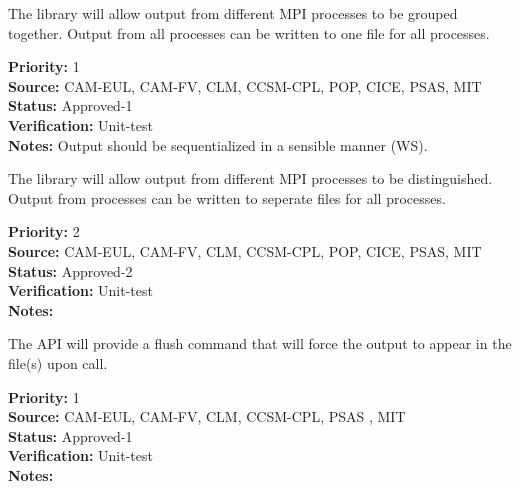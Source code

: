 The library will allow output from different MPI processes to be grouped together.  
Output from all processes can be written to one file for all processes.

\begin{reqlist}
{\bf Priority:} 1 \\
{\bf Source:} CAM-EUL, CAM-FV, CLM, CCSM-CPL, POP, CICE, PSAS, MIT  \\
{\bf Status:} Approved-1 \\
{\bf Verification:} Unit-test \\
{\bf Notes:} Output should be sequentialized in a sensible manner (WS).
\end{reqlist}

The library will allow output from different MPI processes to be distinguished.
Output from processes can be written to seperate files for all processes.

\begin{reqlist}
{\bf Priority:} 2 \\
{\bf Source:} CAM-EUL, CAM-FV, CLM, CCSM-CPL, POP, CICE, PSAS, MIT  \\
{\bf Status:} Approved-2 \\
{\bf Verification:} Unit-test \\
{\bf Notes:} 
\end{reqlist}

The API will provide a flush command that will force the output to appear in the file(s)
upon call.

\begin{reqlist}
{\bf Priority:} 1 \\
{\bf Source:} CAM-EUL, CAM-FV, CLM, CCSM-CPL, PSAS , MIT \\
{\bf Status:} Approved-1 \\
{\bf Verification:} Unit-test \\
{\bf Notes:} 
\end{reqlist}







